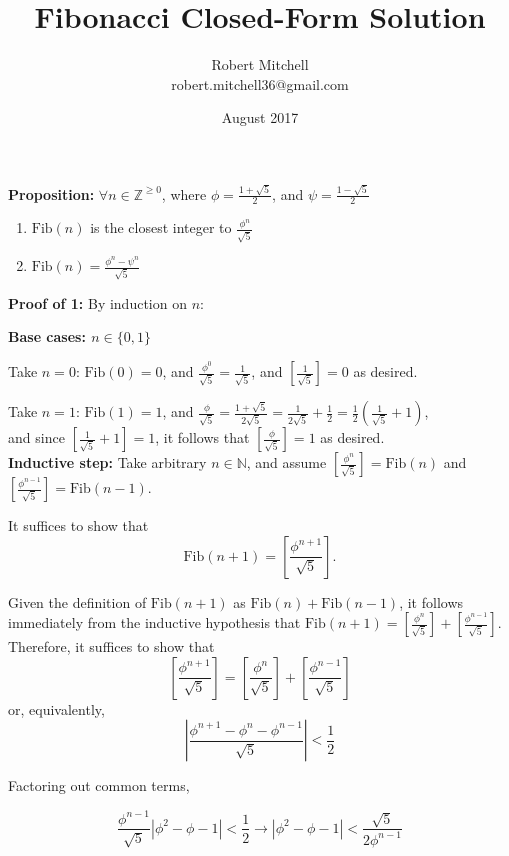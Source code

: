 \documentclass{article}
\title{Fibonacci Closed-Form Solution}
\author{Robert Mitchell \\
        robert.mitchell36@gmail.com}
\date{August 2017}
\begin{document}
\maketitle

\noindent
\textbf{Proposition:} $ \forall n \in \mathbb{Z}^{\geq 0} $, where $ \phi = \frac{1 + \sqrt{5}}{2} $, and $ \psi = \frac{1 - \sqrt{5}}{2} $
\begin{enumerate}
    \item $ \text{Fib}(n) $ is the closest integer to $ \frac{\phi^n}{\sqrt{5}} $
    \item $ \text{Fib}(n) = \frac{\phi^n - \psi^n}{\sqrt{5}} $ \\
\end{enumerate}

\noindent
\textbf{Proof of 1:} By induction on $ n $:

\textbf{Base cases: $ n \in \{0, 1\} $}

Take $ n = 0 $: $ \text{Fib}(0) = 0 $, and $ \frac{\phi^0}{\sqrt{5}} = \frac{1}{\sqrt{5}} $, and $ [ \frac{1}{\sqrt{5}} ] = 0 $ as desired.

Take $ n = 1 $: $ \text{Fib}(1) = 1 $, and $ \frac{\phi}{\sqrt{5}} = \frac{1 + \sqrt{5}}{2\sqrt{5}} = \frac{1}{2\sqrt{5}} + \frac{1}{2} = \frac{1}{2}(\frac{1}{\sqrt{5}} + 1) $, \\
and since $ [\frac{1}{\sqrt{5}} + 1] = 1 $, it follows that $ [\frac{\phi}{\sqrt{5}}] = 1 $ as desired. \\

\textbf{Inductive step:} Take arbitrary $ n \in \mathbb{N} $, and assume $ [\frac{\phi^n}{\sqrt{5}}] = \text{Fib}(n) $ and $ [\frac{\phi^{n-1}}{\sqrt{5}}] = \text{Fib}(n-1) $.

It suffices to show that $$ \text{Fib}(n + 1) = [\frac{\phi^{n+1}}{\sqrt{5}}]. $$

Given the definition of $ \text{Fib}(n + 1) $ as $ \text{Fib}(n) + \text{Fib}(n - 1) $, it follows immediately from the inductive hypothesis that $ \text{Fib}(n + 1) = [\frac{\phi^n}{\sqrt{5}}] + [\frac{\phi^{n-1}}{\sqrt{5}}] $.
Therefore, it suffices to show that $$ [\frac{\phi^{n+1}}{\sqrt{5}}] = [\frac{\phi^n}{\sqrt{5}}] + [\frac{\phi^{n-1}}{\sqrt{5}}] $$
or, equivalently,
$$ |\frac{\phi^{n+1} - \phi^n - \phi^{n-1}}{\sqrt{5}}| < \frac{1}{2} $$

Factoring out common terms,

$$ \frac{\phi^{n-1}}{\sqrt{5}} | \phi^2 - \phi - 1 | < \frac{1}{2} \rightarrow |\phi^2 - \phi - 1| < \frac{\sqrt{5}}{2\phi^{n-1}} $$
\end{document}
